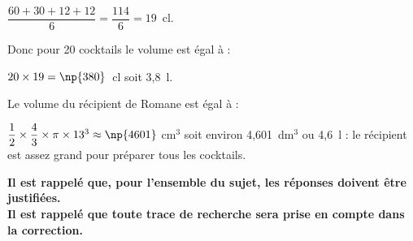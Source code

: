 \documentclass[10pt]{article}
\begin{document}
$\dfrac{60 + 30 + 12 + 12}{6} = \dfrac{114}{6} = 19$~cl.

Donc pour 20 cocktails le volume est égal à :

$20 \times 19 = \np{380}$~cl soit 3,8~l.

Le volume du récipient de Romane est égal à :

$\dfrac{1}{2} \times \dfrac{4}{3}\times \pi \times 13^3 \approx \np{4601}~$cm$^3$ soit environ 4,601~dm$^3$ ou 4,6~l : le récipient est assez grand pour préparer tous les cocktails.
\medskip

\textbf{Il est rappelé que, pour l'ensemble du sujet, les réponses doivent être justifiées.\\
Il est rappelé que toute trace de recherche sera prise en compte dans la
correction.}
\end{document}
